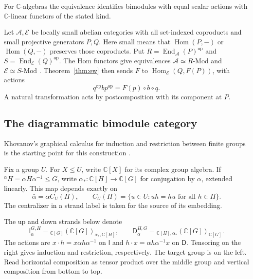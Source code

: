 \documentclass[11pt,a4paper]{article}
\numberwithin{equation}{section}
\theoremstyle{definition}
\newcommand{\C}{\mathbb C}
\newcommand{\Mod}{\text{-}\mathrm{Mod}}
\newcommand{\Hom}{\operatorname{Hom}}
\newcommand{\End}{\operatorname{End}}
\newcommand{\op}{\mathrm{op}}
\newcommand{\co}[1]{\overline{#1}}
\newcommand{\cg}[2]{{}^{#1}\!#2}
\newcommand{\I}{\mathsf I}
\newcommand{\D}{\mathsf D}
\begin{document}
For \(\C\)-algebras the equivalence identifies bimodules with equal
scalar actions with \(\C\)-linear functors of the stated kind.

Let \(\mathcal A,\mathcal E\) be locally small abelian categories with
all set-indexed coproducts and small projective generators \(P,Q\).
Here small means that \(\Hom(P,-)\) or \(\Hom(Q,-)\) preserves those
coproducts. Put \(R=\End_{\mathcal A}(P)^\op\) and
\(S=\End_{\mathcal E}(Q)^\op\). The Hom functors give equivalences
\(\mathcal A\simeq R\Mod\) and \(\mathcal E\simeq S\Mod\)
\cite[Chs.~8--10]{getcurious}. Theorem~\ref{thm:ew} then sends \(F\) to
\(\Hom_{\mathcal E}(Q,F(P))\), with actions
\[
 q^\op b p^\op=F(p)\circ b\circ q.
\]
A natural transformation acts by postcomposition with its component
at \(P\).

\subsection{The diagrammatic bimodule category}\label{sec:diagram-category}

Khovanov's graphical calculus for induction and restriction between finite
groups is the starting point for this construction \cite[\S~3.2]{khovanov}.

Fix a group \(U\). For \(X\le U\), write \(\C[X]\) for its complex group algebra.
If \(\cg{\alpha}{H}=\alpha H\alpha^{-1}\le G\), write
\(\alpha_*:\C[H]\to \C[G]\) for conjugation by \(\alpha\), extended linearly.
This map depends exactly on
\[
 \bar\alpha=\alpha C_U(H),\qquad
 C_U(H)=\{u\in U:uh=hu\text{ for all }h\in H\}.
\]
The centralizer in a strand label is taken for the source of its
embedding.

The up and down strands below denote
\[
 \I_{\co\alpha}^{G,H}={}_{\C[G]}(\C[G])_{\alpha_*,\C[H]},\qquad
 \D_{\co\alpha}^{H,G}={}_{\C[H],\alpha_*}(\C[G])_{\C[G]}.
\]
The actions are \(x\cdot h=x\alpha h\alpha^{-1}\) on \(\I\) and
\(h\cdot x=\alpha h\alpha^{-1}x\) on \(\D\). Tensoring on the right
gives induction and restriction, respectively. The target group
is on the left. Read horizontal composition as tensor product over
the middle group and vertical composition from bottom to top.

\begin{center}
\end{center}
\end{document}
